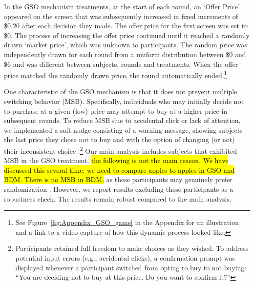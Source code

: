 \documentclass[12pt]{article}
\begin{document}
In the GSO mechanism treatments, at the start of each round, an `Offer Price' appeared on the screen that was subsequently increased in fixed increments of \$0.20 after each decision they made. %
The offer price for the first screen was set to \$0. The process of increasing the offer price continued until it reached a randomly drawn `market price', which was unknown to participants. The random price was independently drawn for each round from a uniform distribution between \$0 and \$6 and was different between subjects, rounds and treatments. When the offer price matched the randomly drawn price, the round automatically ended.\footnote{See Figure~\ref{fig:Appendix_GSO_game} in the Appendix for an illustration and a link to a video capture of how this dynamic process looked like.} 



One characteristic of the GSO mechanism is that it does not prevent multiple switching behavior (MSB). Specifically, individuals who may initially decide not to purchase at a given (low) price may attempt to buy at a higher price in subsequent rounds. To reduce MSB due to accidental click or lack of attention, we implemented a soft nudge consisting of a warning message, showing subjects the last price they chose not to buy and with the option of changing (or not) their inconsistent choice \citep{yu2021multiple}.\footnote{Participants retained full freedom to make choices as they wished. To address potential input errors (e.g., accidental clicks), a confirmation prompt was displayed whenever a participant switched from opting to buy to not buying: ``You are deciding not to buy at this price. Do you want to confirm it?''} 
 Our main analysis includes subjects that exhibited MSB in the GSO treatment, \hl{the following is not the main reason. We have discussed this several time. we need to compare apples to apples in GSO and BDM. There is no MSB in BDM.} as these participants may genuinely prefer randomization \citep{agranov2017stochastic}. However, we report results excluding these participants as a robustness check. The results remain robust compared to the main analysis.
    
\end{document}
